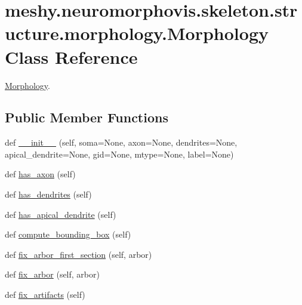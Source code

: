 \hypertarget{classmeshy_1_1neuromorphovis_1_1skeleton_1_1structure_1_1morphology_1_1Morphology}{}\section{meshy.\+neuromorphovis.\+skeleton.\+structure.\+morphology.\+Morphology Class Reference}
\label{classmeshy_1_1neuromorphovis_1_1skeleton_1_1structure_1_1morphology_1_1Morphology}


\hyperlink{classmeshy_1_1neuromorphovis_1_1skeleton_1_1structure_1_1morphology_1_1Morphology}{Morphology}.  


\subsection*{Public Member Functions}
\begin{DoxyCompactItemize}
\item 
def \hyperlink{classmeshy_1_1neuromorphovis_1_1skeleton_1_1structure_1_1morphology_1_1Morphology_a4cb0edda47641ff341fb7d57a304fb6c}{\+\_\+\+\_\+init\+\_\+\+\_\+} (self, soma=None, axon=None, dendrites=None, apical\+\_\+dendrite=None, gid=None, mtype=None, label=None)
\item 
def \hyperlink{classmeshy_1_1neuromorphovis_1_1skeleton_1_1structure_1_1morphology_1_1Morphology_a72f6aa98acfe8c2540d60eab546861d2}{has\+\_\+axon} (self)
\item 
def \hyperlink{classmeshy_1_1neuromorphovis_1_1skeleton_1_1structure_1_1morphology_1_1Morphology_afa1ae7eb8bbf226a70fa2ff879f3ca8f}{has\+\_\+dendrites} (self)
\item 
def \hyperlink{classmeshy_1_1neuromorphovis_1_1skeleton_1_1structure_1_1morphology_1_1Morphology_a0b5ad3b32019347d651232dce17f8470}{has\+\_\+apical\+\_\+dendrite} (self)
\item 
def \hyperlink{classmeshy_1_1neuromorphovis_1_1skeleton_1_1structure_1_1morphology_1_1Morphology_a61642300c932b6cf5ce69ff61adcc2ac}{compute\+\_\+bounding\+\_\+box} (self)
\item 
def \hyperlink{classmeshy_1_1neuromorphovis_1_1skeleton_1_1structure_1_1morphology_1_1Morphology_afd9ea1a8c7ed5ef2556061828840e7f4}{fix\+\_\+arbor\+\_\+first\+\_\+section} (self, arbor)
\item 
def \hyperlink{classmeshy_1_1neuromorphovis_1_1skeleton_1_1structure_1_1morphology_1_1Morphology_a4176f474bd75258e9db4b2ade737c412}{fix\+\_\+arbor} (self, arbor)
\item 
def \hyperlink{classmeshy_1_1neuromorphovis_1_1skeleton_1_1structure_1_1morphology_1_1Morphology_a97b3d880939b021856692d44dc656442}{fix\+\_\+artifacts} (self)
\end{DoxyCompactItemize}
